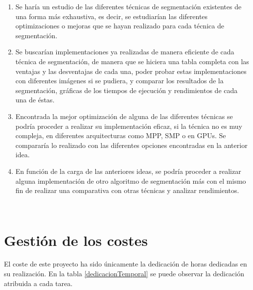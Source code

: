 \begin{enumerate}
	\item Se har\'{i}a un estudio de las diferentes t\'{e}cnicas de segmentaci\'{o}n existentes de una forma m\'{a}s exhaustiva, es decir, se estudiar\'{i}an las diferentes optimizaciones o mejoras que se hayan realizado para cada t\'{e}cnica de segmentaci\'{o}n. 
	\item Se buscar\'{i}an implementaciones ya realizadas de manera eficiente de cada t\'{e}cnica de segmentaci\'{o}n, de manera que se hiciera una tabla completa con las ventajas y las desventajas de cada una, poder probar estas implementaciones con diferentes im\'{a}genes si se pudiera, y comparar los resultados de la segmentaci\'{o}n, gr\'{a}ficas de los tiempos de ejecuci\'{o}n y rendimientos de cada una de \'{e}stas. 
	\item Encontrada la mejor optimizaci\'{o}n de alguna de las diferentes t\'{e}cnicas se podr\'{i}a proceder a realizar su implementaci\'{o}n eficaz, si la t\'{e}cnica no es muy compleja, en diferentes arquitecturas como MPP, SMP o en GPUs. Se comparar\'{i}a lo realizado con las diferentes opciones encontradas en la anterior idea. 
	\item En funci\'{o}n de la carga de las anteriores ideas, se podr\'{i}a proceder a realizar alguna implementaci\'{o}n de otro algoritmo de segmentaci\'{o}n m\'{a}s con el mismo fin de realizar una comparativa con otras t\'{e}cnicas y analizar rendimientos.
\end{enumerate}
 
\

\section{Gesti\'{o}n de los costes}

El coste de este proyecto ha sido \'{u}nicamente la dedicaci\'{o}n de horas dedicadas en su realizaci\'{o}n. En la tabla \ref{dedicacionTemporal} se puede observar la dedicaci\'{o}n atribuida a cada tarea.
 
\

